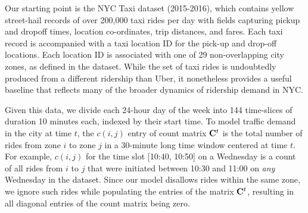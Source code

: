 Our starting point is the NYC Taxi  dataset (2015-2016), which
contains yellow street-hail records of over 200,000 taxi rides per day with fields capturing pickup and dropoff times, 
location co-ordinates, trip distances, and fares.
Each taxi record is accompanied with a taxi location ID for the pick-up and drop-off locations. 
Each location ID is associated with one of 29 non-overlapping city zones, as defined in the
dataset.  While the set of taxi rides is undoubtedly produced from a different ridership than Uber, 
it nonetheless provides a useful baseline that reflects many of the broader dynamics of ridership demand in 
NYC. %


Given this data, we divide each 24-hour day of the week into 144 time-slices of duration 10 minutes each, indexed by their start 
time.  To model traffic demand in the city at time $t$, the $c(i,j)$ entry of count matrix ${\mathbf{C}}^t$ is the total 
number of rides from zone $i$ to zone $j$ in a 30-minute long time window centered at time $t$. For example, 
$c(i,j)$ for the time slot [10:40, 10:50] on a Wednesday is a count of all rides 
from $i$ to $j$ that were initiated between 10:30 and 11:00 
on {\em{any}} Wednesday in the dataset. 
Since our model disallows rides within the same zone, we ignore such rides while populating the entries of 
  the matrix ${\mathbf{C}}^t$, resulting in all diagonal entries of the count matrix being zero.


